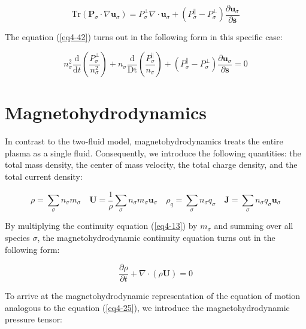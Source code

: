 \begin{enumerate}
    \begin{equation}
        \mathrm{Tr}\left(\mathbf{P}_\sigma\cdot\nabla\mathbf{u}_\sigma\right)=P_\sigma^\perp\nabla\cdot\mathbf{u}_\sigma+(P_\sigma^\parallel-P_\sigma^\perp)\frac{\partial\mathbf{u}_\sigma}{\partial\mathbf{s}}
    \end{equation}

    The equation (\ref{eq4-42}) turns out in the following form in this specific case:

    \begin{equation}
        \label{eq4-46}
        n_\sigma^2\frac{\mathrm{d}}{\mathrm{d}t}\left(\frac{P_\sigma^\perp}{n_\sigma^2}\right)+n_\sigma\frac{\mathrm{d}}{\text{Dt}}\left(\frac{P_\sigma^\parallel}{n_\sigma}\right)+(P_\sigma^\parallel-P_\sigma^\perp)\frac{\partial\mathbf{u}_\sigma}{\partial\mathbf{s}}=0 
    \end{equation}
\end{enumerate}

\section{Magnetohydrodynamics}

\label{mhdmodel}

In contrast to the two-fluid model, magnetohydrodynamics treats the entire plasma as a single fluid. Consequently, we introduce the following quantities: the total mass density, the center of mass velocity, the total charge density, and the total current density:

\begin{equation}
    \rho=\sum_{\sigma}n_\sigma m_\sigma\quad\mathbf{U}=\frac{1}{\rho}\sum_{\sigma}n_\sigma m_\sigma\mathbf{u}_\sigma\quad\rho_q=\sum_{\sigma}n_\sigma q_\sigma\quad\mathbf{J}=\sum_{\sigma}n_\sigma q_\sigma\mathbf{u}_\sigma
\end{equation}

By multiplying the continuity equation (\ref{eq4-13}) by $m_\sigma$ and summing over all species $\sigma$, the magnetohydrodynamic continuity equation turns out in the following form:

\begin{equation}
    \frac{\partial\rho}{\partial t}+\nabla\cdot(\rho\mathbf{U})=0
\end{equation}

To arrive at the magnetohydrodynamic representation of the equation of motion analogous to the equation (\ref{eq4-25}), we introduce the magnetohydrodynamic pressure tensor:

